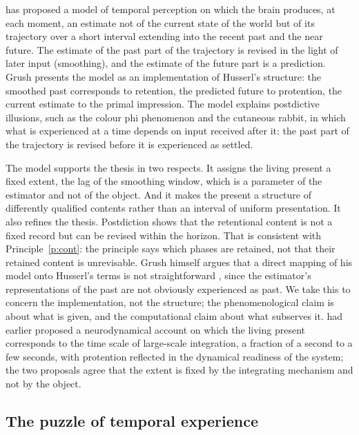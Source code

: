 \documentclass{situationist-preprint}
\begin{document}
\citet{Grush2005,Grush2006} has proposed a model of temporal perception on which the brain produces, at each moment, an estimate not of the current state of the world but of its trajectory over a short interval extending into the recent past and the near future. The estimate of the past part of the trajectory is revised in the light of later input (smoothing), and the estimate of the future part is a prediction. Grush presents the model as an implementation of Husserl's structure: the smoothed past corresponds to retention, the predicted future to protention, the current estimate to the primal impression. The model explains postdictive illusions, such as the colour phi phenomenon and the cutaneous rabbit, in which what is experienced at a time depends on input received after it: the past part of the trajectory is revised before it is experienced as settled.

The model supports the thesis in two respects. It assigns the living present a fixed extent, the lag of the smoothing window, which is a parameter of the estimator and not of the object. And it makes the present a structure of differently qualified contents rather than an interval of uniform presentation. It also refines the thesis. Postdiction shows that the retentional content is not a fixed record but can be revised within the horizon. That is consistent with Principle~\ref{p:cont}: the principle says which phases are retained, not that their retained content is unrevisable. Grush himself argues that a direct mapping of his model onto Husserl's terms is not straightforward \citep{Grush2006}, since the estimator's representations of the past are not obviously experienced as past. We take this to concern the implementation, not the structure; the phenomenological claim is about what is given, and the computational claim about what subserves it. \citet{Varela1999} had earlier proposed a neurodynamical account on which the living present corresponds to the time scale of large-scale integration, a fraction of a second to a few seconds, with protention reflected in the dynamical readiness of the system; the two proposals agree that the extent is fixed by the integrating mechanism and not by the object.

\subsection{The puzzle of temporal experience}
\end{document}
